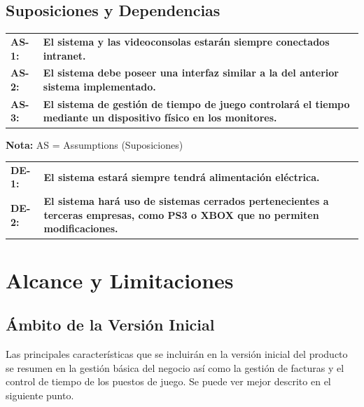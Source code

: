 \documentclass[a4paper,11pt]{article}
\begin{document}
		\subsection{Suposiciones y Dependencias}
			\begin{center}
				\begin{tabular}{l p{11cm}}
					\textbf{AS-1:} & \textbf{El sistema y las videoconsolas estarán siempre conectados intranet.}\\
					\textbf{AS-2:} & \textbf{El sistema debe poseer una interfaz similar a la del anterior sistema 												implementado.} \\
					\textbf{AS-3:} & \textbf{El sistema de gestión de tiempo de juego controlará el tiempo mediante un 										dispositivo físico en los monitores.} \\
				\end{tabular}
			\end{center}
			\textbf{Nota:} AS = Assumptions (Suposiciones)
			\begin{center}
				\begin{tabular}{l p{11cm}}
					\textbf{DE-1:} & \textbf{El sistema estará siempre tendrá alimentación eléctrica.}\\
					\textbf{DE-2:} & \textbf{El sistema hará uso de sistemas cerrados pertenecientes a terceras 											empresas, como PS3 o XBOX  que no permiten modificaciones.} \\
				\end{tabular}
			\end{center}
	\section{Alcance y Limitaciones}
		\subsection{Ámbito de la Versión Inicial}
			Las principales características que se incluirán en la versión inicial del producto se resumen en la gestión básica del 			negocio así como la gestión de facturas y el control de tiempo de los puestos de juego. Se puede ver mejor 					descrito en el siguiente punto.
\end{document}

